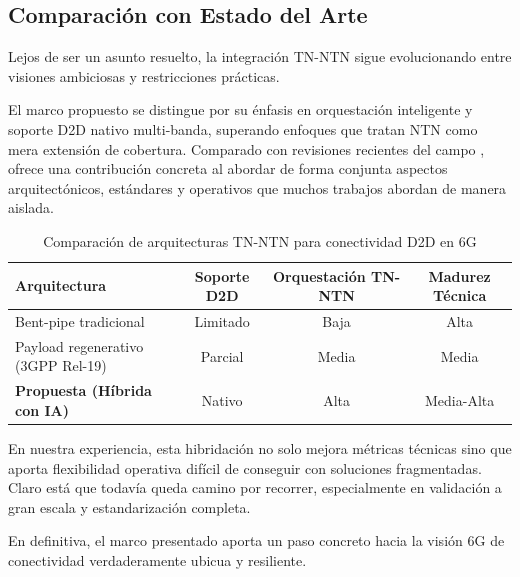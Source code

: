 \subsection{Comparación con Estado del Arte}

Lejos de ser un asunto resuelto, la integración TN-NTN sigue evolucionando entre visiones ambiciosas y restricciones prácticas. 

El marco propuesto se distingue por su énfasis en orquestación inteligente y soporte D2D nativo multi-banda, superando enfoques que tratan NTN como mera extensión de cobertura. Comparado con revisiones recientes del campo \cite{Wang2025_NTN6G}, ofrece una contribución concreta al abordar de forma conjunta aspectos arquitectónicos, estándares y operativos que muchos trabajos abordan de manera aislada.

\begin{table}[t]
\centering
\caption{Comparación de arquitecturas TN-NTN para conectividad D2D en 6G}
\label{tab:architecture_comparison}
\begin{tabular}{lccc}
\hline
Arquitectura & Soporte D2D & Orquestación TN-NTN & Madurez Técnica \\
\hline
Bent-pipe tradicional & Limitado & Baja & Alta \\
Payload regenerativo (3GPP Rel-19) & Parcial & Media & Media \\
\textbf{Propuesta (Híbrida con IA)} & Nativo & Alta & Media-Alta \\
\hline
\end{tabular}
\end{table}

En nuestra experiencia, esta hibridación no solo mejora métricas técnicas sino que aporta flexibilidad operativa difícil de conseguir con soluciones fragmentadas. Claro está que todavía queda camino por recorrer, especialmente en validación a gran escala y estandarización completa.

En definitiva, el marco presentado aporta un paso concreto hacia la visión 6G de conectividad verdaderamente ubicua y resiliente.